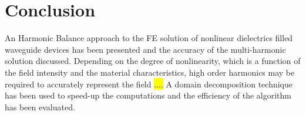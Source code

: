 \documentclass[journal]{IEEEtran}
\begin{document}
\section{Conclusion}
An Harmonic Balance approach to the FE solution of nonlinear dielectrics filled waveguide devices has been presented and the accuracy of the multi-harmonic solution discussed. Depending on the degree of nonlinearity, which is a function of the field intensity and the material characteristics, high order harmonics may be required to accurately represent the field \hl{....}
A domain decomposition technique has been used to speed-up the computations and the efficiency of the algorithm has been evaluated.



%
%





%






\end{document}
